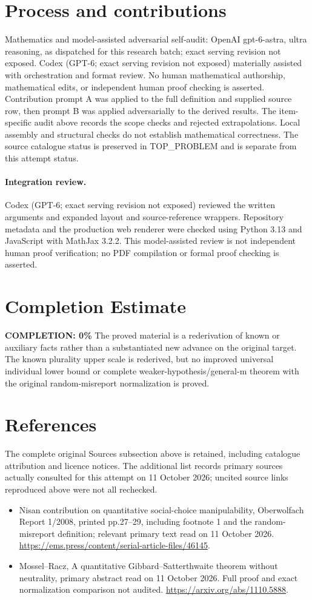 \documentclass[11pt]{article}
\begin{document}
\section{Process and contributions}
Mathematics and model-assisted adversarial self-audit: OpenAI gpt-6-astra, ultra reasoning, as dispatched for this research batch; exact serving revision not exposed. Codex (GPT-6; exact serving revision not exposed) materially assisted with orchestration and format review. No human mathematical authorship, mathematical edits, or independent human proof checking is asserted.
Contribution prompt A was applied to the full definition and supplied source row, then prompt B was applied adversarially to the derived results. The item-specific audit above records the scope checks and rejected extrapolations. Local assembly and structural checks do not establish mathematical correctness. The source catalogue status is preserved in TOP\_PROBLEM and is separate from this attempt status.
\paragraph{Integration review.} Codex (GPT-6; exact serving revision not exposed) reviewed the written arguments and expanded layout and source-reference wrappers. Repository metadata and the production web renderer were checked using Python 3.13 and JavaScript with MathJax 3.2.2. This model-assisted review is not independent human proof verification; no PDF compilation or formal proof checking is asserted.

\section{Completion Estimate}
\noindent\textbf{COMPLETION: 0\%}
The proved material is a rederivation of known or auxiliary facts rather than a substantiated new advance on the original target. The known plurality upper scale is rederived, but no improved universal individual lower bound or complete weaker-hypothesis/general-m theorem with the original random-misreport normalization is proved.
\section{References}
The complete original Sources subsection above is retained, including catalogue attribution and licence notices. The additional list records primary sources actually consulted for this attempt on 11 October 2026; uncited source links reproduced above were not all rechecked.
\begin{itemize}
\item Nisan contribution on quantitative social-choice manipulability, Oberwolfach Report 1/2008, printed pp.27--29, including footnote 1 and the random-misreport definition; relevant primary text read on 11 October 2026. \url{https://ems.press/content/serial-article-files/46145}.
\item Mossel--Racz, A quantitative Gibbard--Satterthwaite theorem without neutrality, primary abstract read on 11 October 2026. Full proof and exact normalization comparison not audited. \url{https://arxiv.org/abs/1110.5888}.
\end{itemize}
\end{document}
